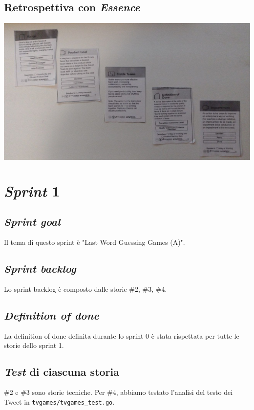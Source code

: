 \documentclass{article}
\begin{document}
\subsection{Retrospettiva con \emph{Essence}}

\includegraphics[width=\textwidth]{essence-0}

\section{\emph{Sprint} 1}

\subsection{\emph{Sprint goal}}

Il tema di questo sprint è "Last Word Guessing Games (A)".

\subsection{\emph{Sprint backlog}}

Lo sprint backlog è composto dalle storie \#2, \#3, \#4.

\subsection{\emph{Definition of done}}

La definition of done definita durante lo sprint 0 è stata rispettata per tutte
le storie dello sprint 1.

\subsection{\emph{Test} di ciascuna storia}

\#2 e \#3 sono storie tecniche. Per \#4, abbiamo testato l'analisi del testo dei
Tweet in \verb!tvgames/tvgames_test.go!.
\end{document}
